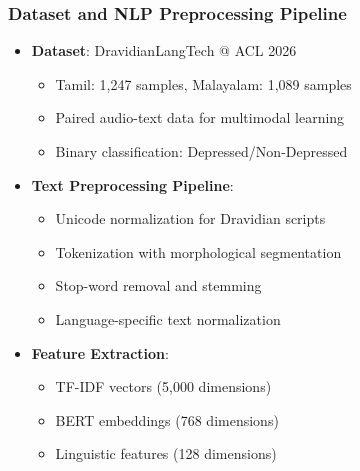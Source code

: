 \documentclass{beamer}
\begin{document}
\begin{frame}
\frametitle{Dataset and NLP Preprocessing Pipeline}
\begin{itemize}
    \item \textbf{Dataset}: DravidianLangTech @ ACL 2026
    \begin{itemize}
        \item Tamil: 1,247 samples, Malayalam: 1,089 samples
        \item Paired audio-text data for multimodal learning
        \item Binary classification: Depressed/Non-Depressed
    \end{itemize}
    \item \textbf{Text Preprocessing Pipeline}:
    \begin{itemize}
        \item Unicode normalization for Dravidian scripts
        \item Tokenization with morphological segmentation
        \item Stop-word removal and stemming
        \item Language-specific text normalization
    \end{itemize}
    \item \textbf{Feature Extraction}:
    \begin{itemize}
        \item TF-IDF vectors (5,000 dimensions)
        \item BERT embeddings (768 dimensions)
        \item Linguistic features (128 dimensions)
    \end{itemize}
\end{itemize}
\end{frame}
\end{document}
